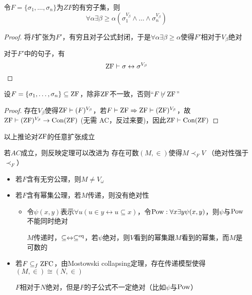 \documentclass[11pt]{article}
\begin{document}
\begin{corollary}[ZF]
令\(F=\{\sigma_1,\dots,\sigma_n\}\)为\(ZF\)的有穷子集，则
\begin{equation*}
\forall\alpha\exists\beta\ge\alpha(\sigma_1^{V_\beta}\wedge\dots\wedge\sigma_n^{V_\beta})
\end{equation*}
\end{corollary}

\begin{proof}
将\(F\)扩张为\(F'\)，有穷且对子公式封闭，于是\(\forall\alpha\exists\beta\ge\alpha\)使得\(F'\)相对于\(V_\beta\)绝对

对于\(F'\)中的句子，有
\begin{equation*}
\operatorname{ZF}\vdash\sigma\leftrightarrow\sigma^{V_\beta}
\end{equation*}
\end{proof}

\begin{corollary}[]
设\(F=\{\sigma_1,\dots,\sigma_n\}\subseteq\operatorname{ZF}\)，除非\(\operatorname{ZF}\)不一致，否则``\(F\not\vdash\operatorname{ZF}\)''
\end{corollary}

\begin{proof}
存在\(V_\beta\)使得\(\operatorname{ZF}\vdash(F)^{V_\beta}\)，若\(F\vdash\operatorname{ZF}\Rightarrow\operatorname{ZF}\vdash(\operatorname{ZF})^{V_\beta}\)，故\(\operatorname{ZF}\vdash(\operatorname{ZF})^{V_\beta}\to\text{Con}(\operatorname{ZF})\) (无需
AC，反过来要)，因此\(\operatorname{ZF}\vdash\text{Con}(\operatorname{ZF})\)
\end{proof}

\begin{remark}
以上推论对\(\operatorname{ZF}\)的任意扩张成立

若\(AC\)成立，则反映定理可以改进为
存在可数\((M,\in)\)使得\(M\prec_FV\) （绝对性强于\(\prec_F\)）
\begin{itemize}
\item 若\(F\)含有无穷公理，则\(M\neq V_\omega\)
\item 若\(F\)含有幂集公理，若\(M\)传递，则没有绝对性
\begin{itemize}
\item 令\(\psi(x,y)\)表示\(\forall u(u\in y\leftrightarrow u\subseteq x)\)，令\(\operatorname{Pow}:\forall x\exists y\psi(x,y)\)，则\(\psi\)与\(\operatorname{Pow}\)不能同时绝对

\(M\)传递时，\(\subseteq\leftrightarrow\subseteq^{\operatorname{eq}}\)，若\(\psi\)绝对，则\(V\)看到的幂集跟\(M\)看到的幂集，而\(M\)是可数的
\end{itemize}

\item 若\(F\subseteq_f\operatorname{ZFC}\)，由Mostowski collapsing定理，存在传递模型使得\((M,\in)\cong(N,\in)\)

\(F\)相对于\(N\)绝对，但是\(F\)的子公式不一定绝对（比如\(\psi\)与\(\operatorname{Pow}\)）
\end{itemize}
\end{remark}
\end{document}
